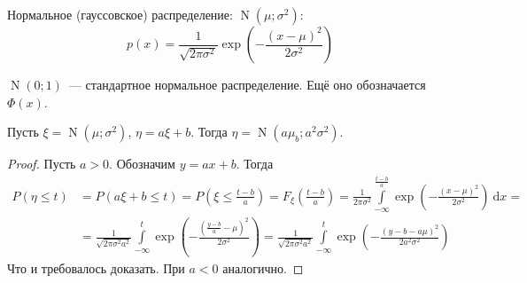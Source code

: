 \documentclass{article}
\begin{document}
    \begin{example}
        Нормальное (гауссовское) распределение: $\operatorname{N}(\mu;\sigma^2)$:
        $$
        p(x)=\frac1{\sqrt{2\pi\sigma^2}}\exp\left(-\frac{(x-\mu)^2}{2\sigma^2}\right)
        $$
        \begin{figure}[H]
        \end{figure}\noindent
        $\operatorname{N}(0;1)$~--- стандартное нормальное распределение. Ещё оно обозначается $\Phi(x)$.
    \end{example}
    \begin{claim}
        Пусть $\xi=\operatorname{N}(\mu;\sigma^2)$, $\eta=a\xi+b$. Тогда
        $\eta=\operatorname{N}(a\mu_b;a^2\sigma^2)$.
    \end{claim}
    \begin{proof}
        Пусть $a>0$. Обозначим $y=ax+b$. Тогда
        \[\begin{split}
            P(\eta\leqslant t)&=P(a\xi+b\leqslant t)=P(\xi\leqslant\frac{t-b}a)=F_\xi(\frac{t-b}a)=\frac1{2\pi\sigma^2}\int\limits_{-\infty}^{\frac{t-b}a}\exp\left(-\frac{(x-\mu)^2}{2\sigma^2}\right)~\mathrm dx=\\
            &=\frac1{\sqrt{2\pi\sigma^2a^2}}\int\limits_{-\infty}^t\exp\left(-\frac{(\frac{y-b}a-\mu)^2}{2\sigma^2}\right)=\frac1{\sqrt{2\pi\sigma^2a^2}}\int\limits_{-\infty}^t\exp\left(-\frac{(y-b-a\mu)^2}{2a^2\sigma^2}\right)
        \end{split}\]
        Что и требовалось доказать. При $a<0$ аналогично.
    \end{proof}
\end{document}
